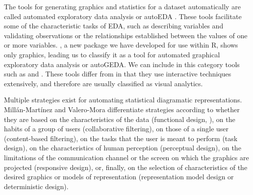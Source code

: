 The tools for generating graphics and statistics for a dataset
automatically are called automated exploratory data analysis or autoEDA
\citep{Staniak2019}. These tools facilitate some of the characteristic
tasks of EDA, such as describing variables and validating observations
or the relationships established between the values of one or more
variables. , a new package we have developed for use within
R, shows only graphics, leading us to classify it as a tool
for automated graphical exploratory data analysis or autoGEDA. We can
include in this category tools such as  \citep{Cook2007} and
 \citep{Theus2008}. These tools differ from  in
that they use interactive techniques extensively, and therefore are
usually classified as visual analytics.

Multiple strategies exist for automating statistical diagramatic
representations. Millán-Martínez and Valero-Mora
\citeyearpar{Millan2018} differentiate strategies according to whether
they are based on the characteristics of the data (functional design,
\citet{Kamps1999}), on the habits of a group of users (collaborative
filtering), on those of a single user (content-based filtering), on the
tasks that the user is meant to perform (task design), on the
characteristics of human perception (perceptual design), on the
limitations of the communication channel or the screen on which the
graphics are projected (responsive design), or, finally, on the
selection of characteristics of the desired graphics or models of
representation (representation model design or deterministic design).

